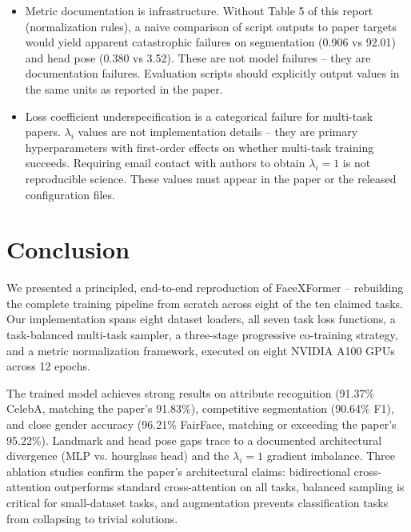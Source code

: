 \documentclass[11pt]{article}
\begin{document}
\begin{itemize}\item Metric documentation is infrastructure. Without Table 5 of this report (normalization rules), a naive comparison of script outputs to paper targets would yield apparent catastrophic failures on segmentation (0.906 vs 92.01) and head pose (0.380 vs 3.52). These are not model failures -- they are documentation failures. Evaluation scripts should explicitly output values in the same units as reported in the paper.\end{itemize}

\begin{itemize}\item Loss coefficient underspecification is a categorical failure for multi-task papers. $\lambda_i$ values are not implementation details -- they are primary hyperparameters with first-order effects on whether multi-task training succeeds. Requiring email contact with authors to obtain $\lambda_i=1$ is not reproducible science. These values must appear in the paper or the released configuration files.\end{itemize}



\section{Conclusion}

We presented a principled, end-to-end reproduction of FaceXFormer -- rebuilding the complete training pipeline from scratch across eight of the ten claimed tasks. Our implementation spans eight dataset loaders, all seven task loss functions, a task-balanced multi-task sampler, a three-stage progressive co-training strategy, and a metric normalization framework, executed on eight NVIDIA A100 GPUs across 12 epochs.

The trained model achieves strong results on attribute recognition (91.37\% CelebA, matching the paper's 91.83\%), competitive segmentation (90.64\% F1), and close gender accuracy (96.21\% FairFace, matching or exceeding the paper's 95.22\%). Landmark and head pose gaps trace to a documented architectural divergence (MLP vs. hourglass head) and the $\lambda_i=1$ gradient imbalance. Three ablation studies confirm the paper's architectural claims: bidirectional cross-attention outperforms standard cross-attention on all tasks, balanced sampling is critical for small-dataset tasks, and augmentation prevents classification tasks from collapsing to trivial solutions.
\end{document}
